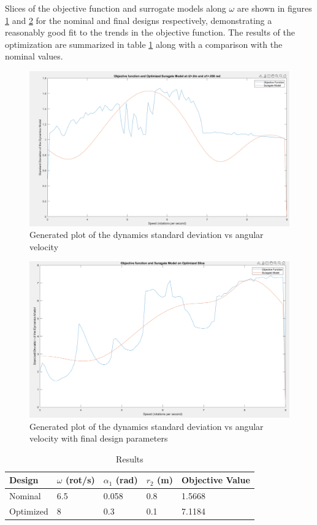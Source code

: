 \documentclass[11pt]{article}%
\begin{document}
Slices of the objective function and surrogate models along $\omega$ are shown in figures \ref{fig:opinit} and \ref{fig:finslice} for the nominal and final designs respectively, demonstrating a reasonably good fit to the trends in the objective function. The results of the optimization are summarized in table \ref{tab:results} along with a comparison with the nominal values.
	\begin{figure}[H]
    \centering
    \includegraphics[width=0.75\linewidth]{opinit.png}
    \caption{ Generated plot of the dynamics standard deviation vs angular velocity  }
    \label{fig:opinit}
\end{figure}
\begin{figure}[H]
    \centering
    \includegraphics[width=0.75\linewidth]{finslice.png}
    \caption{ Generated plot of the dynamics standard deviation vs angular velocity with final design parameters  }
    \label{fig:finslice}
\end{figure}
	
	\begin{table}[H]
	\caption{Results}
\label{tab:results}
\center
\begin{tabular}{lllll}
Design    & $\omega$ (rot/s) & $\alpha_{1}$ (rad) & $r_{2}$ (m) & Objective Value \\ \hline
Nominal   & 6.5     & 0.058 & 0.8 & 1.5668          \\
Optimized & 8       & 0.3   & 0.1 & 7.1184         
\end{tabular}
\end{table}
	
\end{document}
